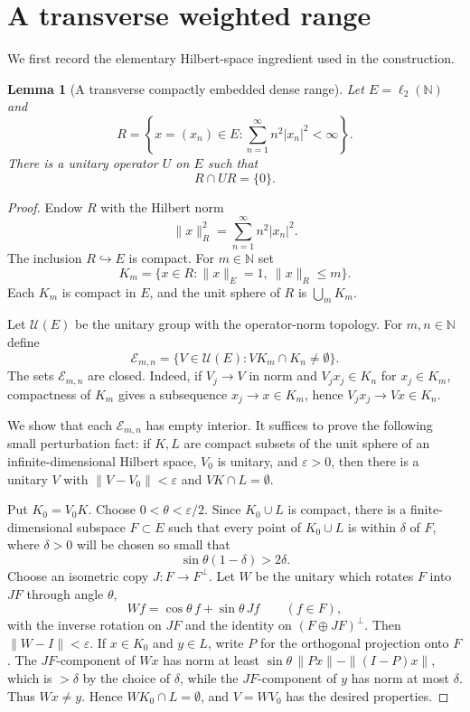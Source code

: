 \documentclass[11pt]{article}
\newtheorem{lemma}{Lemma}
\newcommand{\N}{\mathbb N}
\begin{document}
\section*{A transverse weighted range}

We first record the elementary Hilbert-space ingredient used in the construction.

\begin{lemma}[A transverse compactly embedded dense range]\label{lem:transverse-range}
Let $E=\ell_2(\N)$ and
\[
        R=\left\{x=(x_n)\in E:\sum_{n=1}^\infty n^2 |x_n|^2<\infty\right\}.
\]
There is a unitary operator $U$ on $E$ such that
\[
        R\cap U R=\{0\}.
\]
\end{lemma}

\begin{proof}
Endow $R$ with the Hilbert norm
\[
        \|x\|_R^2=\sum_{n=1}^\infty n^2 |x_n|^2.
\]
The inclusion $R\hookrightarrow E$ is compact.  For $m\in\N$ set
\[
        K_m=\{x\in R:\|x\|_E=1,\ \|x\|_R\leq m\}.
\]
Each $K_m$ is compact in $E$, and the unit sphere of $R$ is $\bigcup_m K_m$.

Let $\mathcal U(E)$ be the unitary group with the operator-norm topology.  For $m,n\in\N$ define
\[
        \mathcal E_{m,n}
        =
        \{V\in\mathcal U(E): V K_m\cap K_n\neq\emptyset\}.
\]
The sets $\mathcal E_{m,n}$ are closed.  Indeed, if $V_j\to V$ in norm and $V_jx_j\in K_n$ for $x_j\in K_m$, compactness of $K_m$ gives a subsequence $x_j\to x\in K_m$, hence $V_jx_j\to Vx\in K_n$.

We show that each $\mathcal E_{m,n}$ has empty interior.  It suffices to prove the following small perturbation fact: if $K,L$ are compact subsets of the unit sphere of an infinite-dimensional Hilbert space, $V_0$ is unitary, and $\varepsilon>0$, then there is a unitary $V$ with $\|V-V_0\|<\varepsilon$ and $V K\cap L=\emptyset$.

Put $K_0=V_0K$.  Choose $0<\theta<\varepsilon/2$.  Since $K_0\cup L$ is compact, there is a finite-dimensional subspace $F\subset E$ such that every point of $K_0\cup L$ is within $\delta$ of $F$, where $\delta>0$ will be chosen so small that
\[
        \sin\theta(1-\delta)>2\delta.
\]
Choose an isometric copy $J:F\to F^\perp$.  Let $W$ be the unitary which rotates $F$ into $JF$ through angle $\theta$,
\[
        W f=\cos\theta\,f+\sin\theta\,Jf\qquad(f\in F),
\]
with the inverse rotation on $JF$ and the identity on $(F\oplus JF)^\perp$.
Then $\|W-I\|<\varepsilon$.  If $x\in K_0$ and $y\in L$, write $P$ for the orthogonal projection onto $F$.  The $JF$-component of $Wx$ has norm at least $\sin\theta\,\|Px\|-\|(I-P)x\|$, which is $>\delta$ by the choice of $\delta$, while the $JF$-component of $y$ has norm at most $\delta$.  Thus $Wx\neq y$.  Hence $WK_0\cap L=\emptyset$, and $V=WV_0$ has the desired properties.


\end{proof}
\end{document}
